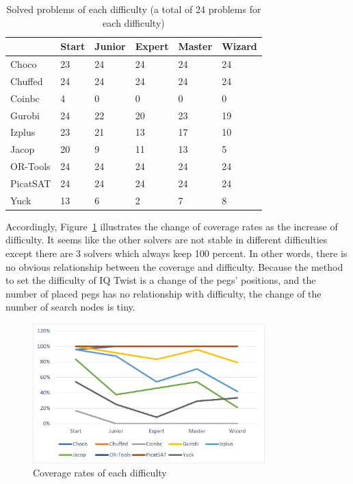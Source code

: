 \begin{table}[htbp]
\centering
\caption{Solved problems of each difficulty (a total of 24 problems for each difficulty)}
\label{tab:solvedproblemforeach difficulty}
\begin{tabular}{|l|l|l|l|l|l|}
\hline
	    &Start&	Junior&	Expert&	Master&	Wizard\\
\hline
Choco   &23   &24 &24 &24 &24\\
\hline
Chuffed	&24   &24 &24 &24 &24\\
\hline
Coinbc	&4    &0  &0  &	0 &0\\
\hline
Gurobi	&24   &22 &20 &	23&19\\
\hline
Izplus	&23   &21 &13 &	17&10\\
\hline
Jacop	&20   &9  &11 &13 &5\\
\hline
OR-Tools	&24   &24 &24 &	24&24\\
\hline
PicatSAT&24   &24 &24 &24 &24\\
\hline
Yuck    &13	  &6  &2  &7  &8\\
\hline
\end{tabular}
\end{table}
Accordingly, Figure~\ref{fig:comparisonIQtwist} illustrates the change of coverage rates as the increase of difficulty. It seems like the other solvers are not stable in different difficulties except there are 3 solvers which always keep 100 percent. In other words, there is no obvious relationship between the coverage and difficulty. Because the method to set the difficulty of IQ Twist is a change of the pegs' positions, and the number of placed pegs has no relationship with difficulty, the change of the number of search nodes is tiny. 
\begin{figure}[H]
    \centering
    \includegraphics[width=0.8\textwidth]{figs/separated coverage.png}
    \caption{Coverage rates of each difficulty}
    \label{fig:comparisonIQtwist}
\end{figure}
